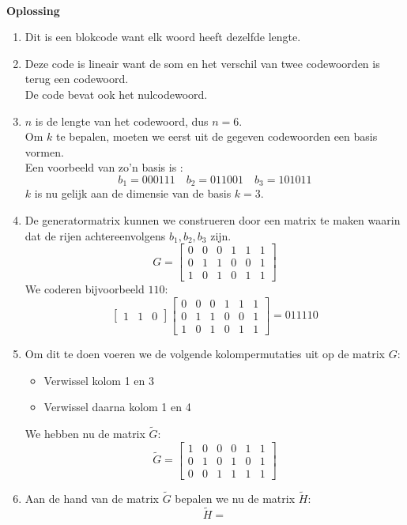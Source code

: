 \documentclass[11pt,a4paper,titlepage]{article}
\begin{document}
	\noindent \\ \textbf{Oplossing}
	\begin{enumerate}[label=(\alph*)]
	\item Dit is een blokcode want elk woord heeft dezelfde lengte.
	\item Deze code is lineair want de som en het verschil van twee codewoorden is terug een codewoord.\\ De code bevat ook het nulcodewoord.
	\item $n$ is de lengte van het codewoord, dus $n = 6$. \\
		Om $k$ te bepalen, moeten we eerst uit de gegeven codewoorden een basis vormen.\\
		Een voorbeeld van zo'n basis is :
			$$b_1 = 000111 \quad b_2 = 011001 \quad b_3 = 101011$$
		$k$ is nu gelijk aan de dimensie van de basis $k = 3$.
	\item De generatormatrix kunnen we construeren door een matrix te maken waarin dat de rijen achtereenvolgens $b_1, b_2, b_3$ zijn.
$$ G = 
 \begin{bmatrix}
0 & 0 & 0 & 1 & 1 & 1 \\
0 & 1 & 1 & 0 & 0 & 1 \\
1 & 0 & 1 & 0 & 1 & 1
 \end{bmatrix}$$
		We coderen bijvoorbeeld $110$:
			$$  \begin{bmatrix}1&1&0\end{bmatrix}  \begin{bmatrix}
0 & 0 & 0 & 1 & 1 & 1 \\
0 & 1 & 1 & 0 & 0 & 1 \\
1 & 0 & 1 & 0 & 1 & 1
 \end{bmatrix} = 011110$$
	\item Om dit te doen voeren we de volgende kolompermutaties uit op de matrix $G$:
			\begin{itemize}	
				\item Verwissel kolom 1 en 3
				\item Verwissel daarna kolom 1 en 4
			\end{itemize}
		We hebben nu de matrix $\tilde{G}$:
			$$ \tilde{G} = 
 \begin{bmatrix}
1 & 0 & 0& 0  & 1 & 1 \\
0 & 1 & 0& 1 & 0 & 1 \\
0 & 0 & 1&1 & 1 & 1
 \end{bmatrix}$$
	\item Aan de hand van de matrix $\tilde{G}$ bepalen we nu de matrix $\tilde{H}$:
			$$ \tilde{H} = 
$$
\end{enumerate}
\end{document}

